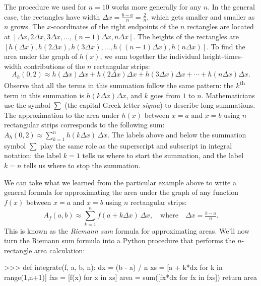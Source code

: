 		The procedure we used for $n=10$ works more generally for any $n$.
		In the general case,
		the rectangles have width $\Delta x = \frac{b-a}{n} = \frac{2}{n}$,
		which gets smaller and smaller as $n$ grows.
		The $x$-coordinates of the right endpoints of the $n$ rectangles
		are located at $[\Delta x, 2\Delta x, 3\Delta x, \ldots, (n-1)\Delta x, n\Delta x]$.
		The heights of the rectangles are
		$[h(\Delta x), h(2\Delta x), h(3\Delta x), \ldots, h((n-1)\Delta x), h(n\Delta x)]$.
		To find the area under the graph of $h(x)$,
		we sum together the individual height-times-width
		contributions of the $n$ rectangular strips: 
		\[ 
			A_h(0,2)
				\approx	h(\Delta x) \Delta x
						+ h(2\Delta x) \Delta x
						+ h(3\Delta x) \Delta x
						+ \cdots
						+ h(n\Delta x) \Delta x.
		\]
		Observe that all the terms in this summation follow the same pattern:
		the $k$\textsuperscript{th} term in this summation is $h(k\Delta x)\Delta x$,
		and $k$ goes from $1$ to $n$.
		Mathematicians use the symbol $\sum$
		(the capital Greek letter \emph{sigma})
		to describe long summations.
		The approximation to the area under $h(x)$ between $x=a$ and $x=b$
		using $n$ rectangular strips corresponds to the following sum:
		$A_h(0,2) \approx \sum_{k=1}^{n} h(k\Delta x)\,\Delta x$.
		The labels above and below the summation symbol $\sum$
		play the same role as the superscript and subscript in integral notation:
		the label $k=1$ tells us where to start the summation,
		and the label $k=n$ tells us where to stop the summation.


		We can take what we learned from the particular example above
		to write a general formula for approximating the area under the graph of
		any function $f(x)$ between $x=a$ and $x=b$ using $n$ rectangular strips:
		\[
			A_f(a,b) \approx \sum_{k=1}^{n} f(a + k\Delta x)\,\Delta x,
			\quad\text{where}\quad
			\Delta x = \tfrac{b-a}{n}.
		\]
		This is known as the \emph{Riemann sum} formula for approximating areas.
		We'll now turn the Riemann sum formula into a Python procedure
		that performs the $n$-rectangle area calculation:

		\begin{codeblock}[]
		>>> def integrate(f, a, b, n):
		        dx = (b - a) / n
		        xs = [a + k*dx for k in range(1,n+1)]
		        fxs = [f(x) for x in xs]
		        area = sum([fx*dx for fx in fxs])
		        return area
		\end{codeblock}


